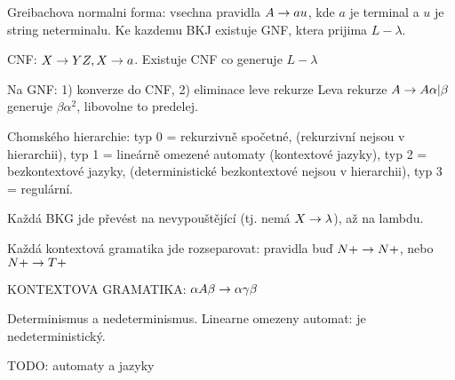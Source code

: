 Greibachova normalni forma: vsechna pravidla $A\rightarrow au$, kde $a$ je terminal
a $u$ je string neterminalu. Ke kazdemu BKJ existuje GNF, ktera prijima
$L-\lambda$.

CNF: $X\rightarrow YZ, X\rightarrow a$. Existuje CNF co generuje $L-\lambda$

Na GNF: 1) konverze do CNF, 2) eliminace leve rekurze
Leva rekurze $A\rightarrow A\alpha|\beta$ generuje $\beta\alpha^2$, libovolne to
predelej.

Chomského hierarchie: typ 0 = rekurzivně spočetné, (rekurzivní nejsou v
hierarchii), typ 1 = lineárně omezené automaty (kontextové jazyky), typ 2 =
bezkontextové jazyky, (deterministické bezkontextové nejsou v hierarchii),
typ 3 = regulární.

Každá BKG jde převést na nevypouštějící (tj. nemá $X\rightarrow\lambda$), až na lambdu.

Každá kontextová gramatika jde rozseparovat: pravidla buď $N+\rightarrow N+$, nebo
$N+\rightarrow T+$

KONTEXTOVA GRAMATIKA: $\alpha A\beta\rightarrow\alpha\gamma\beta$

Determinismus a nedeterminismus.
Linearne omezeny automat: je nedeterministický.

TODO: automaty a jazyky
